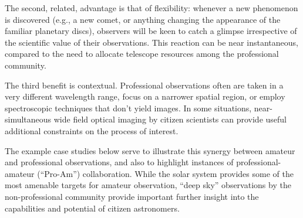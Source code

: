 \documentclass{ar2e}
\begin{document}
The second, related, advantage is that of flexibility: whenever a new phenomenon
is discovered (e.g., a new comet, or anything changing the appearance of the
familiar planetary discs), observers will be keen to catch a glimpse
irrespective of the scientific value of their observations.  This reaction can
be near instantaneous, compared to the need to allocate telescope resources
among the professional community.  

The third benefit is contextual.  Professional observations often are taken in a
very different wavelength range, focus on a narrower spatial region, or employ
spectroscopic techniques that don't yield images. In some situations,
near-simultaneous wide field optical imaging by citizen scientists can provide
useful additional constraints on the process of interest.

The example case studies below serve to illustrate this synergy between amateur
and professional observations, and also to highlight instances of
professional-amateur (``Pro-Am'') collaboration. While the solar system provides
some of the most amenable targets for amateur observation, ``deep sky''
observations by the non-professional community provide important further insight
into the capabilities and potential of citizen astronomers.

\end{document}
